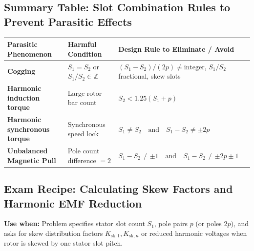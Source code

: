 \subsection{Summary Table: Slot Combination Rules to Prevent Parasitic Effects}
\begin{center}
\begin{tabular}{@{}p{}p{}p{}@{}}
\toprule
\textbf{Parasitic Phenomenon} & \textbf{Harmful Condition} & \textbf{Design Rule to Eliminate / Avoid} \\
\midrule
\textbf{Cogging} & $S_1 = S_2$ or $S_1/S_2 \in \mathbb{Z}$ & $(S_1 - S_2)/(2p) \neq \text{integer}$, $S_1/S_2$ fractional, skew slots \\
\textbf{Harmonic induction torque} & Large rotor bar count & $S_2 < 1.25(S_1 + p)$ \\
\textbf{Harmonic synchronous torque} & Synchronous speed lock & $S_1 \neq S_2 \quad\text{and}\quad S_1 - S_2 \neq \pm 2p$ \\
\textbf{Unbalanced Magnetic Pull} & Pole count difference $= 2$ & $S_1 - S_2 \neq \pm 1 \quad\text{and}\quad S_1 - S_2 \neq \pm 2p \pm 1$ \\
\bottomrule
\end{tabular}
\end{center}

\subsection{Exam Recipe: Calculating Skew Factors and Harmonic EMF Reduction}
\textbf{Use when:} Problem specifies stator slot count $S_1$, pole pairs $p$ (or poles $2p$), and asks for skew distribution factors $K_{\mathrm{sk},1}, K_{\mathrm{sk},n}$ or reduced harmonic voltages when rotor is skewed by one stator slot pitch.

